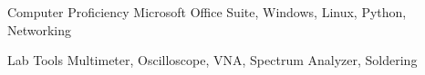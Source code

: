 


\begin{cvskillwrapper}
\begin{cvskills}

  \cvskill
    {Computer Proficiency} %
    {Microsoft Office Suite, Windows, Linux, Python, Networking} %

\end{cvskills}


\begin{cvskills}

  \cvskill
    {Lab Tools} %
    {Multimeter, Oscilloscope, VNA, Spectrum Analyzer, Soldering} %

\end{cvskills}

\end{cvskillwrapper}
